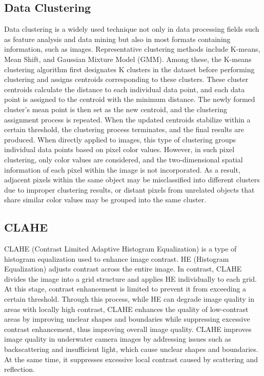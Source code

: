 \subsection{Data Clustering}
Data clustering is a widely used technique not only in data processing fields such as feature analysis and data mining but also in most formats containing information, such as images.
Representative clustering methods include K-means, Mean Shift, and Gaussian Mixture Model (GMM). Among these, the K-means clustering algorithm first designates K clusters in the dataset before performing clustering and assigns centroids corresponding to these clusters.
These cluster centroids calculate the distance to each individual data point, and each data point is assigned to the centroid with the minimum distance.
The newly formed cluster’s mean point is then set as the new centroid, and the clustering assignment process is repeated.
When the updated centroids stabilize within a certain threshold, the clustering process terminates, and the final results are produced.
When directly applied to images, this type of clustering groups individual data points based on pixel color values.
However, in such pixel clustering, only color values are considered, and the two-dimensional spatial information of each pixel within the image is not incorporated.
As a result, adjacent pixels within the same object may be misclassified into different clusters due to improper clustering results, or distant pixels from unrelated objects that share similar color values may be grouped into the same cluster.

\subsection{CLAHE}
CLAHE (Contrast Limited Adaptive Histogram Equalization) is a type of histogram equalization used to enhance image contrast.
HE (Histogram Equalization) adjusts contrast across the entire image. In contrast, CLAHE divides the image into a grid structure and applies HE individually to each grid.
At this stage, contrast enhancement is limited to prevent it from exceeding a certain threshold.
Through this process, while HE can degrade image quality in areas with locally high contrast, CLAHE enhances the quality of low-contrast areas by improving unclear shapes and boundaries while suppressing excessive contrast enhancement, thus improving overall image quality.
CLAHE improves image quality in underwater camera images by addressing issues such as backscattering and insufficient light, which cause unclear shapes and boundaries. At the same time, it suppresses excessive local contrast caused by scattering and reflection.

